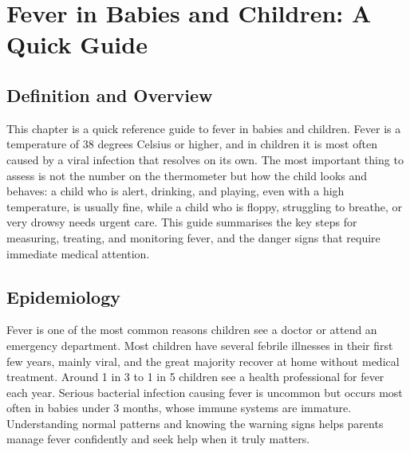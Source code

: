 \chapter{Fever in Babies and Children: A Quick Guide}

\section*{Definition and Overview}
This chapter is a quick reference guide to fever in babies and children. Fever is a temperature of 38 degrees Celsius or higher, and in children it is most often caused by a viral infection that resolves on its own. The most important thing to assess is not the number on the thermometer but how the child looks and behaves: a child who is alert, drinking, and playing, even with a high temperature, is usually fine, while a child who is floppy, struggling to breathe, or very drowsy needs urgent care. This guide summarises the key steps for measuring, treating, and monitoring fever, and the danger signs that require immediate medical attention.

\section*{Epidemiology}
Fever is one of the most common reasons children see a doctor or attend an emergency department. Most children have several febrile illnesses in their first few years, mainly viral, and the great majority recover at home without medical treatment. Around 1 in 3 to 1 in 5 children see a health professional for fever each year. Serious bacterial infection causing fever is uncommon but occurs most often in babies under 3 months, whose immune systems are immature. Understanding normal patterns and knowing the warning signs helps parents manage fever confidently and seek help when it truly matters.

